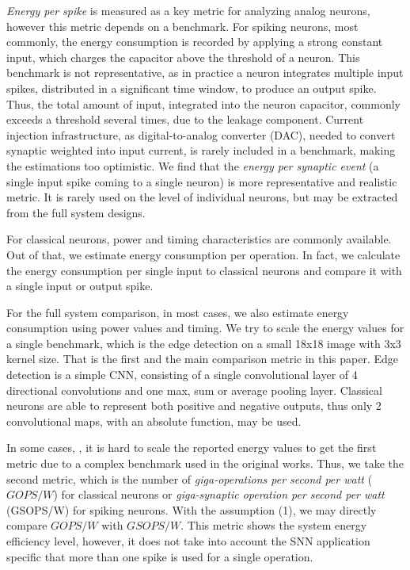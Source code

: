 \documentclass[conference, compsoc]{IEEEtran}
\begin{document}
\textit{Energy per spike} is measured as a key metric for analyzing analog neurons, however this metric depends on a benchmark. For spiking neurons, most commonly, the energy consumption is recorded by applying a strong constant input, which charges the capacitor above the threshold of a neuron. This benchmark is not representative, as in practice a neuron integrates multiple input spikes, distributed in a significant time window, to produce an output spike. Thus, the total amount of input, integrated into the neuron capacitor, commonly exceeds a threshold several times, due to the leakage component. Current injection infrastructure, as digital-to-analog converter (DAC), needed to convert synaptic weighted into input current, is rarely included in a benchmark, making the estimations too optimistic. We find that the \textit{energy per synaptic event} (a single input spike coming to a single neuron) is more representative and realistic metric. It is rarely used on the level of individual neurons, but may be extracted from the full system designs.

For classical neurons, power and timing characteristics are commonly available. Out of that, we estimate energy consumption per operation. In fact, we calculate the energy consumption per single input to classical neurons and compare it with a single input or output spike.

For the full system comparison, in most cases, we also estimate energy consumption using power values and timing. We try to scale the energy values for a single benchmark, which is the edge detection on a small 18x18 image with 3x3 kernel size. That is the first and the main comparison metric in this paper. Edge detection is a simple CNN, consisting of a single convolutional layer of 4 directional convolutions and one max, sum or average pooling layer. Classical neurons are able to represent both positive and negative outputs, thus only 2 convolutional maps, with an absolute function, may be used. 

In some cases, \cite{NeuFlow,DVS_analog,DVS_digital,CAVIAR}, it is hard to scale the reported energy values to get the first metric due to a complex benchmark used in the original works. Thus, we take the second metric, which is the number of \textit{giga-operations per second per watt} ($ GOPS/W $) for classical neurons or \textit{giga-synaptic operation per second per watt} (GSOPS/W) for spiking neurons. With the assumption (1), we may directly compare $ GOPS/W $ with $ GSOPS/W $. This metric shows the system energy efficiency level, however, it does not take into account the SNN application specific that more than one spike is used for a single operation.
\end{document}
